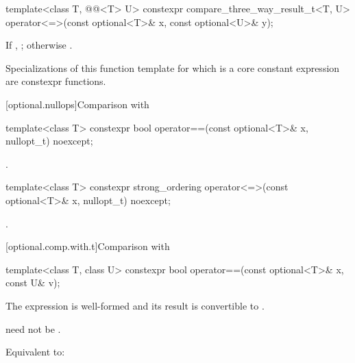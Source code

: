 %
\begin{itemdecl}
template<class T, @@<T> U>
  constexpr compare_three_way_result_t<T, U>
    operator<=>(const optional<T>& x, const optional<U>& y);
\end{itemdecl}

\begin{itemdescr}
\pnum
\returns
If , ; otherwise .

\pnum
\remarks
Specializations of this function template
for which  is a core constant expression
are constexpr functions.
\end{itemdescr}

[optional.nullops]{Comparison with }

%
\begin{itemdecl}
template<class T> constexpr bool operator==(const optional<T>& x, nullopt_t) noexcept;
\end{itemdecl}

\begin{itemdescr}
\pnum
\returns
{}.
\end{itemdescr}

%
\begin{itemdecl}
template<class T> constexpr strong_ordering operator<=>(const optional<T>& x, nullopt_t) noexcept;
\end{itemdecl}

\begin{itemdescr}
\pnum
\returns
{}.
\end{itemdescr}

[optional.comp.with.t]{Comparison with }

%
\begin{itemdecl}
template<class T, class U> constexpr bool operator==(const optional<T>& x, const U& v);
\end{itemdecl}

\begin{itemdescr}
\pnum
\constraints
The expression  is well-formed and
its result is convertible to .
\begin{note}
 need not be .
\end{note}

\pnum
\effects
Equivalent to: 
\end{itemdescr}

